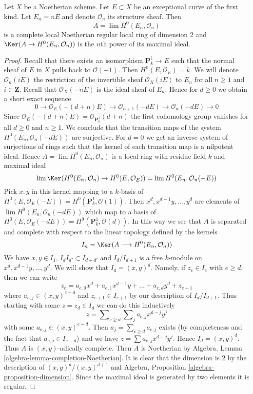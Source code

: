 \begin{lemma}
\label{lemma-exceptional-first-kind-local}
Let $X$ be a Noetherian scheme. Let $E \subset X$ be an
exceptional curve of the first kind. Let $E_n = nE$ and
denote $\mathcal{O}_n$ its structure sheaf. Then
$$
A = \lim H^0(E_n, \mathcal{O}_n)
$$
is a complete local Noetherian regular local ring of dimension $2$
and $\Ker(A \to H^0(E_n, \mathcal{O}_n))$ is the $n$th power of
its maximal ideal.
\end{lemma}

\begin{proof}
Recall that there exists an isomorphism $\mathbf{P}^1_k \to E$
such that the normal sheaf of $E$ in $X$ pulls back to $\mathcal{O}(-1)$.
Then $H^0(E, \mathcal{O}_E) = k$.
We will denote $\mathcal{O}_n(iE)$ the restriction of the invertible
sheaf $\mathcal{O}_X(iE)$ to $E_n$ for all $n \geq 1$ and $i \in \mathbf{Z}$.
Recall that $\mathcal{O}_X(-nE)$ is the ideal sheaf of $E_n$. Hence
for $d \geq 0$ we obtain a short exact sequence
$$
0 \to \mathcal{O}_E(-(d + n)E) \to
\mathcal{O}_{n + 1}(-dE) \to
\mathcal{O}_n(-dE) \to 0
$$
Since $\mathcal{O}_E(-(d + n)E) = \mathcal{O}_{\mathbf{P}^1_k}(d + n)$
the first cohomology group vanishes for all $d \geq 0$ and $n \geq 1$.
We conclude that the transition maps of the system
$H^0(E_n, \mathcal{O}_n(-dE))$ are surjective. For $d = 0$
we get an inverse system of surjections of rings such that the
kernel of each transition map is a nilpotent ideal.
Hence $A = \lim H^0(E_n, \mathcal{O}_n)$ is a local ring
with residue field $k$ and maximal ideal
$$
\lim \Ker(H^0(E_n, \mathcal{O}_n) \to H^0(E, \mathcal{O}_E)) =
\lim H^0(E_n, \mathcal{O}_n(-E))
$$
Pick $x, y$ in this kernel mapping to a $k$-basis of
$H^0(E, \mathcal{O}_E(-E)) = H^0(\mathbf{P}^1_k, \mathcal{O}(1))$.
Then $x^d, x^{d - 1}y, \ldots, y^d$ are
elements of $\lim H^0(E_n, \mathcal{O}_n(-dE))$ which map to a basis
of $H^0(E, \mathcal{O}_E(-dE)) = H^0(\mathbf{P}^1_k, \mathcal{O}(d))$.
In this way we see that $A$ is separated and complete with respect
to the linear topology defined by the kernels
$$
I_n = \Ker(A \longrightarrow H^0(E_n, \mathcal{O}_n))
$$
We have $x, y \in I_1$, $I_d I_{d'} \subset I_{d + d'}$
and $I_d/I_{d + 1}$ is a free $k$-module on $x^d, x^{d - 1}y, \ldots, y^d$.
We will show that $I_d = (x, y)^d$. Namely, if $z_e \in I_e$ with
$e \geq d$, then we can write
$$
z_e = a_{e, 0} x^d + a_{e, 1} x^{d - 1}y + \ldots + a_{e, d}y^d + z_{e + 1}
$$
where $a_{e, j} \in (x, y)^{e - d}$ and $z_{e + 1} \in I_{e + 1}$
by our description of $I_d/I_{d + 1}$. Thus starting with some
$z = z_d \in I_d$ we can do this inductively
$$
z = \sum\nolimits_{e \geq d} \sum\nolimits_j a_{e, j} x^{d - j} y^j
$$
with some $a_{e, j} \in (x, y)^{e - d}$. Then $a_j = \sum_{e \geq d} a_{e, j}$
exists (by completeness and the fact that $a_{e, j} \in I_{e - d}$)
and we have $z = \sum a_{e, j} x^{d - j} y^j$.
Hence $I_d = (x, y)^d$.
Thus $A$ is $(x, y)$-adically complete. Then $A$ is
Noetherian by Algebra, Lemma \ref{algebra-lemma-completion-Noetherian}.
It is clear that the dimension is $2$ by the description
of $(x, y)^d/(x, y)^{d + 1}$ and
Algebra, Proposition \ref{algebra-proposition-dimension}.
Since the maximal ideal
is generated by two elements it is regular.
\end{proof}

